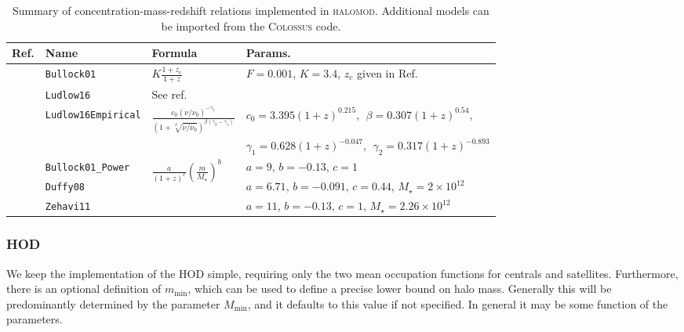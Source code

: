 \documentclass[5p,aas_macros]{elsarticle}
\begin{document}
\begin{table}
\centering
\begin{tabu}{X[1.7l]X[1.5l]X[2l]X[3.9l]}
\toprule[0.05cm] 
Ref. & Name & Formula & Params. \\
\toprule[0.05cm]
      
        \citet{Bullock2001} & \texttt{Bullock01} & $\displaystyle K\frac{1+z_c}{1+z}$ & $F=0.001$, $K=3.4$, $z_c$ given in Ref. \\ 
        
        \citet{Ludlow2016} & \texttt{Ludlow16} & See ref. & \\
        \citet{Ludlow2016} & \texttt{Ludlow16Empirical} & $\displaystyle \frac{c_0 (\nu/\nu_0)^{-\gamma_1}}{ \left(1 + \sqrt[\beta]{\nu/\nu_0}\right)^{\beta(\gamma_2 - \gamma_1)}} $ & $c_0 = 3.395(1+z)^{0.215}, \ \ \beta = 0.307(1+z)^{0.54},$ \\
        & & & $\displaystyle \gamma_1 = 0.628(1+z)^{-0.047}, \ \ \gamma_2 = 0.317(1+z)^{-0.893}$\\ 
        \midrule

        \citet{Bullock2001} & \texttt{Bullock01\_Power} &  & $a=9$, $b=-0.13$, $c=1$ \\

        \citet{Duffy2008} & \texttt{Duffy08} & & $a=6.71$, $b=-0.091$, $c=0.44$, $M_\star=2\times10^{12}$ \\

        \citet{Zehavi2011} & \texttt{Zehavi11} & & $a=11$, $b=-0.13$, $c=1$, $M_\star=2.26\times10^{12}$ \\
        
         \bottomrule[0.05cm]
\end{tabu}
\caption{Summary of concentration-mass-redshift relations implemented in \textsc{halomod}. Additional models can be imported from the \textsc{Colossus} code.}
\label{tab:models_concentration}
\end{table}


\subsubsection{HOD}
\label{sec:halomod:components:hod}
We keep the implementation of the HOD simple, requiring only the two mean occupation functions for centrals and satellites. Furthermore, there is an optional definition of $m_\text{min}$, which can be used to define a precise lower bound on halo mass. Generally this will be predominantly determined by the parameter $M_\text{min}$, and it defaults to this value if not specified. In general it may be some function of the parameters.
\end{document}
